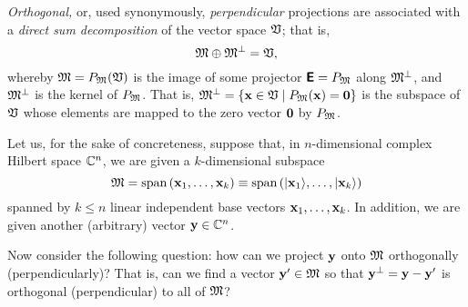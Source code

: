 {\em Orthogonal,} or, used synonymously,
{\em perpendicular} projections
are associated with a {\em direct sum decomposition} of the vector space ${\frak V}$;
that is,
\begin{equation}
 {\frak M}\oplus {\frak M}^\perp ={\frak V},
\label{2012-m-ch-fdvs-perp}
\end{equation}
whereby $ {\frak M}= P_{\frak M}({\frak V})$
is the image of some projector $\textsf{\textbf{E}}=P_{\frak M}$
along ${\frak M}^\perp$, and  ${\frak M}^\perp$ is
the kernel of $P_{\frak M}$.
That is, ${\frak M}^\perp = \left\{{\bf x} \in {\frak V} \mid P_{\frak M}({\bf x}) = {\bf 0}\right\}$
is the subspace of ${\frak V}$
whose elements are mapped to the zero vector ${\bf 0}$ by $P_{\frak M}$.


Let us, for the sake of concreteness,
suppose that, in $n$-dimensional complex Hilbert space
${\Bbb C}^n$, we are given a $k$-dimensional subspace
\begin{equation}
{\frak M} = \textrm{span}\left( {\bf x}_1,\ldots ,{\bf x}_k \right)
\equiv \textrm{span}\left(\vert {\bf x}_1\rangle ,\ldots ,\vert {\bf x}_k \right\rangle )
\end{equation}
spanned
by  $k \le n$  linear independent base vectors ${\bf x}_1,\ldots ,{\bf x}_k$.
In addition, we are given another (arbitrary) vector ${\bf y} \in {\Bbb C}^n$.

Now consider the following question:
how can we project ${\bf y}$ onto ${\frak M}$ orthogonally (perpendicularly)?
That is, can we find a vector ${\bf y}' \in {\frak M}$ so that ${\bf y}^\perp = {\bf y} - {\bf y}'$
is orthogonal (perpendicular) to all of ${\frak M}$?

